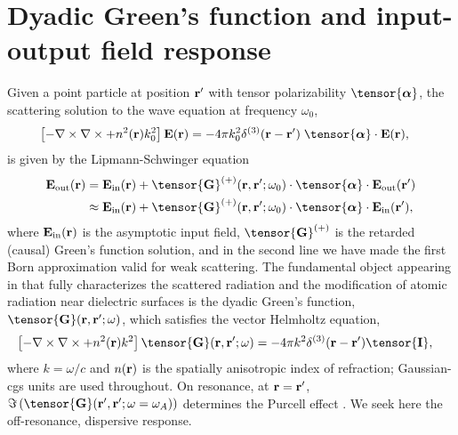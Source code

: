 \documentclass[preprint,aps,pra,onecolumn]{revtex4-1} %
\newcommand{\inp}{{\rm in}}
\newcommand{\out}{{\rm out}}
\begin{document}
\section{Dyadic Green's function and input-output field response}

Given a point particle at position $\mathbf{r}'$ with tensor polarizability $\tensor{\boldsymbol{\alpha}}$, the  
scattering solution to the wave equation at frequency $\omega_0$, 
\begin{align}\label{eq:Maxwellwithsource2}
\left[ - \nabla \times\nabla \times + n^2(\br)k_0^2 \right] \mathbf{E}(\br) &= -4\pi  k_0^2 
\delta^{(3)}(\br-\br')\;  \tensor{\boldsymbol{\alpha}}\cdot \mathbf{E}(\br),
\end{align}
is given by the Lipmann-Schwinger equation \cite{wubs_multiple-scattering_2004}
\begin{align}
\mathbf{E}_{\out}(\br) &=\mathbf{E}_{\inp}(\br)+\tensor{\mathbf{G}}^{(+)}(\br , \br'; \omega_0)\cdot 
\tensor{\boldsymbol{\alpha}}\cdot \mathbf{E}_{\out}(\br')\\
&\approx \mathbf{E}_{\inp}(\br)+ \tensor{\mathbf{G}}^{(+)}(\br , \br'; \omega_0) \cdot 
\tensor{\boldsymbol{\alpha}}\cdot \mathbf{E}_{\inp}(\br'), \label{Eq::ScatteredField}
\end{align}
where $\mathbf{E}_{\inp}(\br)$ is the asymptotic input field, $\tensor{\mathbf{G}}^{(+)}$ is the retarded (causal) Green's function solution, and in the second line we have made the first Born approximation valid for weak scattering. The fundamental object appearing in  that fully characterizes the scattered radiation and the modification of atomic radiation near dielectric surfaces is the dyadic Green's function, $\tensor{\mathbf{G}}(\br, \br';\omega)$, which satisfies the vector Helmholtz equation,
 \begin{align}
\left[ -\nabla\times\nabla\times + n^2(\mbf{r}) k^2 \right] \tensor{\mathbf{G}}(\br, \br';\omega) &= -4 \pi 
k^2 \delta^{(3)}(\mathbf{r}-\mathbf{r}') \tensor{\mathbf{I}},
\end{align}
where $k=\omega/c$ and $n(\mathbf{r})$ is the spatially anisotropic index of refraction; Gaussian-cgs units are used throughout.  On resonance, at $\mathbf{r}=\mathbf{r}'$, 
$\Im\left(\tensor{\mathbf{G}}(\br', \br'; \omega= \omega_A) \right)$ determines the Purcell effect \cite{}.  We 
seek here the off-resonance, dispersive response.
\end{document}
